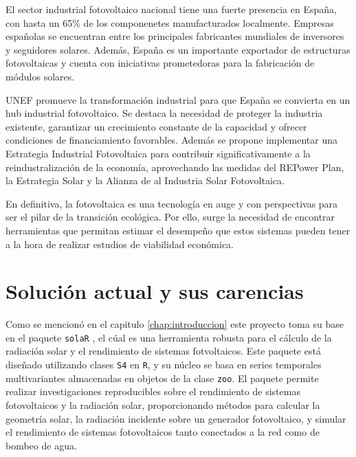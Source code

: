 El sector industrial fotovoltaico nacional tiene una fuerte presencia en España, con hasta un 65\% de los componenetes manufacturados localmente. Empresas españolas se encuentran entre los principales fabricantes mundiales de inversores y seguidores solares. Además, España es un importante exportador de estructuras fotovoltaicas y cuenta con iniciativas prometedoras para la fabricación de módulos solares.

UNEF promueve la transformación industrial para que España se convierta en un hub industrial fotovoltaico. Se destaca la necesidad de proteger la industria existente, garantizar un crecimiento constante de la capacidad y ofrecer condiciones de financiamiento favorables. Además se propone implementar una Estrategia Industrial Fotovoltaica para contribuir significativamente a la reindustralización de la economía, aprovechando las medidas del REPower Plan, la Estrategia Solar y la Alianza de al Industria Solar Fotovoltaica.

En definitiva, la fotovoltaica es una tecnología en auge y con perspectivas para ser el pilar de la transición ecológica. Por ello, surge la necesidad de encontrar herramientas que permitan estimar el desempeño que estos sistemas pueden tener a la hora de realizar estudios de viabilidad económica.

\section{Solución actual y sus carencias}
\label{sec:org9081d17}
Como se mencionó en el capitulo \ref{chap:introduccion} este proyecto toma su base en el paquete \texttt{solaR} \cite{perpinan12}, el cúal es una herramienta robusta para el cálculo de la radiación solar y el rendimiento de sistemas fotvoltaicos. Este paquete está diseñado utilizando clases \texttt{S4} en \texttt{R}, y su núcleo se basa en series temporales multivariantes almacenadas en objetos de la clase \texttt{zoo}. El paquete permite realizar investigaciones reproducibles sobre el rendimiento de sistemas fotovoltaicos y la radiación solar, proporcionando métodos para calcular la geometría solar, la radiación incidente sobre un generador fotovoltaico, y simular el rendimiento de sistemas fotovoltaicos tanto conectados a la red como de bombeo de agua.


